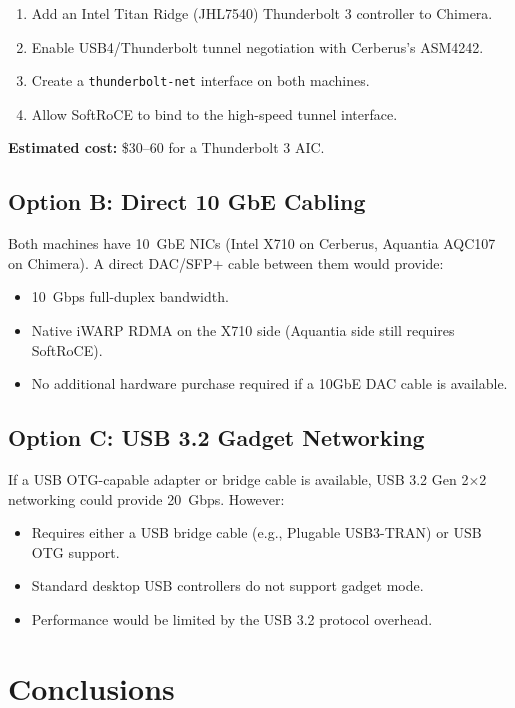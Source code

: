 \documentclass[11pt,letterpaper]{article}
\begin{document}
\begin{enumerate}
    \item Add an Intel Titan Ridge (JHL7540) Thunderbolt 3 controller to Chimera.
    \item Enable USB4/Thunderbolt tunnel negotiation with Cerberus's ASM4242.
    \item Create a \texttt{thunderbolt-net} interface on both machines.
    \item Allow SoftRoCE to bind to the high-speed tunnel interface.
\end{enumerate}

\textbf{Estimated cost:} \$30--60 for a Thunderbolt 3 AIC.

\subsection{Option B: Direct 10 GbE Cabling}

Both machines have 10~GbE NICs (Intel X710 on Cerberus, Aquantia AQC107 on Chimera). A direct DAC/SFP+ cable between them would provide:

\begin{itemize}
    \item 10~Gbps full-duplex bandwidth.
    \item Native iWARP RDMA on the X710 side (Aquantia side still requires SoftRoCE).
    \item No additional hardware purchase required if a 10GbE DAC cable is available.
\end{itemize}

\subsection{Option C: USB 3.2 Gadget Networking}

If a USB OTG-capable adapter or bridge cable is available, USB 3.2 Gen 2$\times$2 networking could provide 20~Gbps. However:
\begin{itemize}
    \item Requires either a USB bridge cable (e.g., Plugable USB3-TRAN) or USB OTG support.
    \item Standard desktop USB controllers do not support gadget mode.
    \item Performance would be limited by the USB 3.2 protocol overhead.
\end{itemize}

\section{Conclusions}
\end{document}
